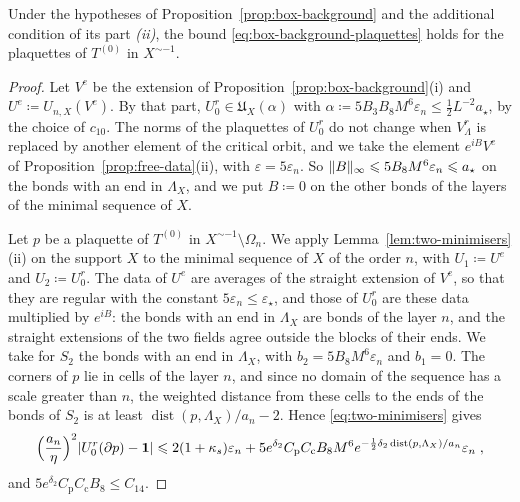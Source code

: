 \documentclass[11pt]{preprint}
\newcommand{\id}{\mathbf 1}
\newcommand{\dist}{\operatorname{dist}}
\DeclarePairedDelimiter{\abs}{\lvert}{\rvert}
\DeclarePairedDelimiter{\norm}{\lVert}{\rVert}
\numberwithin{equation}{section}
\begin{document}
\begin{lemma}\label{lem:box-plaquettes}
Under the hypotheses of Proposition~\ref{prop:box-background} and the additional condition of its part \emph{(ii)}, the bound \eqref{eq:box-background-plaquettes} holds for the plaquettes of $T^{(0)}$ in $X^{\sim-1}$.
\end{lemma}

\begin{proof}
Let $V^e$ be the extension of Proposition~\ref{prop:box-background}(i) and $U^e \coloneqq U_{n,X}(V^e)$. By that part, $U^r_0 \in \mathfrak U_X(\alpha)$ with $\alpha \coloneqq 5B_3B_8M^6\varepsilon_n \leqslant \frac{1}{2}L^{-2}a_\star$, by the choice of $c_{10}$. The norms of the plaquettes of $U^r_0$ do not change when $V^r_\Lambda$ is replaced by another element of the critical orbit, and we take the element $e^{iB}V^e$ of Proposition~\ref{prop:free-data}(ii), with $\varepsilon = 5\varepsilon_n$. So $\norm B_\infty \leqslant 5B_8M^6\varepsilon_n \leqslant a_\star$ on the bonds with an end in $\Lambda_X$, and we put $B \coloneqq 0$ on the other bonds of the layers of the minimal sequence of $X$.

Let $p$ be a plaquette of $T^{(0)}$ in $X^{\sim-1} \setminus \Omega_n$. We apply Lemma~\ref{lem:two-minimisers}(ii) on the support $X$ to the minimal sequence of $X$ of the order $n$, with $U_1 \coloneqq U^e$ and $U_2 \coloneqq U^r_0$. The data of $U^e$ are averages of the straight extension of $V^e$, so that they are regular with the constant $5\varepsilon_n \leqslant \varepsilon_\star$, and those of $U^r_0$ are these data multiplied by $e^{iB}$: the bonds with an end in $\Lambda_X$ are bonds of the layer $n$, and the straight extensions of the two fields agree outside the blocks of their ends. We take for $S_2$ the bonds with an end in $\Lambda_X$, with $b_2 = 5B_8M^6\varepsilon_n$ and $b_1 = 0$. The corners of $p$ lie in cells of the layer $n$, and since no domain of the sequence has a scale greater than $n$, the weighted distance from these cells to the ends of the bonds of $S_2$ is at least $\dist(p, \Lambda_X)/a_n - 2$. Hence \eqref{eq:two-minimisers} gives
\[
    \Bigl(\frac{a_n}{\eta}\Bigr)^2\abs{U^r_0(\partial p) - \id} \leqslant 2(1 + \kappa_s)\varepsilon_n + 5e^{\delta_2}C_{\mathrm p}C_{\mathrm c}B_8M^6e^{-\frac{1}{2}\delta_2\dist(p, \Lambda_X)/a_n}\varepsilon_n\;,
\]
and $5e^{\delta_2}C_{\mathrm p}C_{\mathrm c}B_8 \leqslant C_{14}$.


\end{proof}
\end{document}
